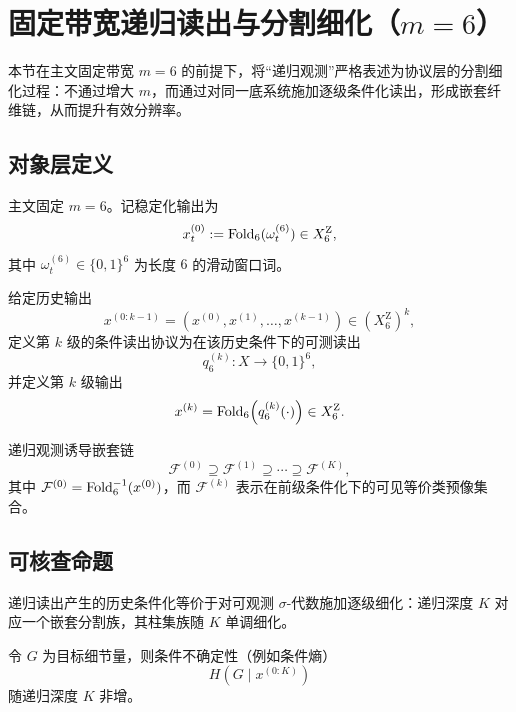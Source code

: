 \section{固定带宽递归读出与分割细化（\texorpdfstring{$m=6$}{m=6}）}

本节在主文固定带宽 $m=6$ 的前提下，将“递归观测”严格表述为协议层的分割细化过程：不通过增大 $m$，而通过对同一底系统施加逐级条件化读出，形成嵌套纤维链，从而提升有效分辨率。

\subsection{对象层定义}

\begin{definition}[第一级输出]\label{def:fw-rec-level0}
主文固定 $m=6$。记稳定化输出为
$$
x^{(0)}_t:=\mathrm{Fold}_6(\omega_t^{(6)})\in X_6^{\mathrm Z},
$$
其中 $\omega_t^{(6)}\in\{0,1\}^6$ 为长度 $6$ 的滑动窗口词。
\end{definition}

\begin{definition}[第 $k$ 级条件读出与输出]\label{def:fw-rec-levelk}
给定历史输出
$$
x^{(0:k-1)}=(x^{(0)},x^{(1)},\dots,x^{(k-1)})\in (X_6^{\mathrm Z})^{k},
$$
定义第 $k$ 级的条件读出协议为在该历史条件下的可测读出
$$
q_6^{(k)}:X\to \{0,1\}^6,
$$
并定义第 $k$ 级输出
$$
x^{(k)}=\mathrm{Fold}_6\!\left(q_6^{(k)}(\cdot)\right)\in X_6^{\mathrm Z}.
$$
\end{definition}

\begin{definition}[嵌套纤维链]\label{def:fw-rec-nested}
递归观测诱导嵌套链
$$
\mathcal{F}^{(0)}\supseteq \mathcal{F}^{(1)}\supseteq \cdots \supseteq \mathcal{F}^{(K)},
$$
其中 $\mathcal{F}^{(0)}=\mathrm{Fold}_6^{-1}(x^{(0)})$，而 $\mathcal{F}^{(k)}$ 表示在前级条件化下的可见等价类预像集合。
\end{definition}

\subsection{可核查命题}

\begin{proposition}[R1：递归读出等价于分割的逐级细化]\label{prop:fw-rec-R1}
递归读出产生的历史条件化等价于对可观测 $\sigma$-代数施加逐级细化：递归深度 $K$ 对应一个嵌套分割族，其柱集族随 $K$ 单调细化。
\end{proposition}

\begin{proposition}[R2：条件不确定性的单调性]\label{prop:fw-rec-R2}
令 $G$ 为目标细节量，则条件不确定性（例如条件熵）
$$
H(G\mid x^{(0:K)})
$$
随递归深度 $K$ 非增。
\end{proposition}

